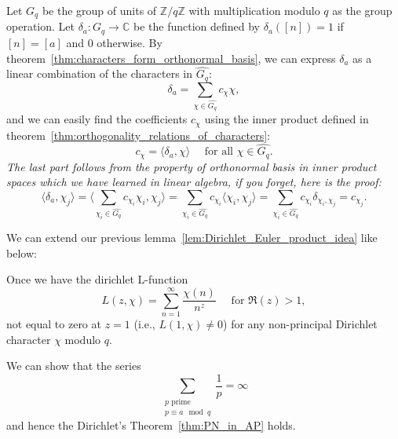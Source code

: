 \documentclass{elegantbook}
\begin{document}
\begin{example} \label{ex:expressing_delta_function_as_linear_combination_of_characters}
  Let $G_q$ be the group of units of $\mathbb{Z}/q\mathbb{Z}$ with multiplication modulo $q$ as the group operation.
  Let $\delta_{a}: G_q \to \mathbb{C}$ be the function defined by $\delta_{a}([n]) = 1$ if $[n] = [a]$ and $0$ otherwise. By theorem~\ref{thm:characters_form_orthonormal_basis}, we can express $\delta_{a}$ as a linear combination of the characters in $\widehat{G_q}$:
  \[
    \delta_{a} = \sum_{\chi \in \widehat{G_q}} c_{\chi} \chi,
  \]
  and we can easily find the coefficients $c_{\chi}$ using the inner product defined in theorem~\ref{thm:orthogonality_relations_of_characters}:
  \[
    c_{\chi} = \langle \delta_{a}, \chi \rangle \quad \text{ for all } \chi \in \widehat{G_q}.
  \]
  \textit{The last part follows from the property of orthonormal basis in inner product spaces which we have learned in linear algebra, if you forget, here is the proof:
  \[
    \langle \delta_{a}, \chi_j \rangle = \langle \sum_{\chi_i \in \widehat{G_q}} c_{\chi_i} \chi_i, \chi_j \rangle = \sum_{\chi_i \in \widehat{G_q}} c_{\chi_i} \langle \chi_i, \chi_j \rangle = \sum_{\chi_i \in \widehat{G_q}} c_{\chi_i} \delta_{\chi_i,\chi_j} = c_{\chi_j}.
  \]}
\end{example}

\begin{lemma} \label{lem:Dirichlet_L_function_bounded_near_1}
  We can extend our previous lemma~\ref{lem:Dirichlet_Euler_product_idea} like below:

  Once we have the dirichlet L-function
  \[
    L(z,\chi) = \sum_{n=1}^{\infty} \frac{\chi(n)}{n^z} \quad \text{ for } \Re(z) > 1,
  \]
  not equal to zero at $z=1$ (i.e., $L(1,\chi) \ne 0$) for any non-principal Dirichlet character $\chi$ modulo $q$.
  
  We can show that the series
  \[
    \sum_{\substack{p \text{ prime} \\ p \equiv a \mod q}} \frac{1}{p} = \infty
  \]
  and hence the Dirichlet's Theorem~\ref{thm:PN_in_AP} holds.
\end{lemma}
\end{document}
